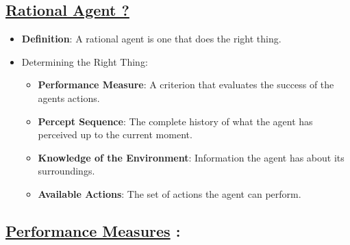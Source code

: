 \documentclass[
]{article}
\begin{document}
\subsection{\texorpdfstring{\ul{Rational Agent
?}}{Rational Agent ?}}\label{rational-agent-}

\begin{itemize}
\item
  \textbf{Definition}: A rational agent is one that does the right
  thing.
\item
  Determining the Right Thing:

  \begin{itemize}
  \item
    \textbf{Performance Measure}: A criterion that evaluates the success
    of the agent\textquotesingle s actions.
  \item
    \textbf{Percept Sequence}: The complete history of what the agent
    has perceived up to the current moment.
  \item
    \textbf{Knowledge of the Environment}: Information the agent has
    about its surroundings.
  \item
    \textbf{Available Actions}: The set of actions the agent can
    perform.
  \end{itemize}
\end{itemize}

\subsection{\texorpdfstring{\ul{Performance Measures}
:}{Performance Measures :}}\label{performance-measures-}
\end{document}

